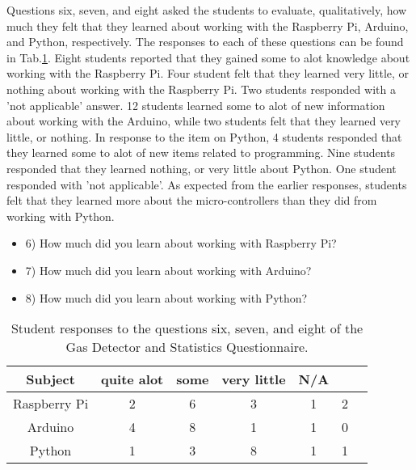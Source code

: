 Questions six, seven, and eight asked the students to evaluate, qualitatively, how much they felt that they learned about working with the Raspberry Pi, Arduino, and Python, respectively.
The responses to each of these questions can be found in Tab.\ref{tab:t7q678}.
Eight students reported that they gained some to alot knowledge about working with the Raspberry Pi.
Four student felt that they learned very little, or nothing about working with the Raspberry Pi.
Two students responded with a 'not applicable' answer.
12 students learned some to alot of new information about working with the Arduino, while two students felt that they learned very little, or nothing.
In response to the item on Python, 4 students responded that they learned some to alot of new items related to programming.
Nine students responded that they learned nothing, or very little about Python.
One student responded with 'not applicable'.
As expected from the earlier responses, students felt that they learned more about the micro-controllers than they did from working with Python.


\begin{table}[htpb]
  \scriptsize
  \begin{center}
    \caption{\scriptsize Student responses to the questions six, seven, and eight of the Gas Detector and Statistics Questionnaire.}
    \label{tab:t7q678}
    \begin{itemize}
    \item 6) How much did you learn about working with Raspberry Pi?
    \item 7) How much did you learn about working with Arduino?
    \item 8) How much did you learn about working with Python?
      
    \end{itemize}
    

    \begin{tabular}{|c | c | c | c | c | c | c|}
      \hline
      Subject & quite alot & some & very little & N/A\\
      \hline
      Raspberry Pi & 2 & 6 & 3 & 1 & 2 \\
      \hline
      Arduino & 4 & 8 & 1 & 1 & 0 \\
      \hline
      Python & 1 & 3 & 8 & 1 & 1 \\
      \hline
    \end{tabular}
  \end{center}%
\end{table}





